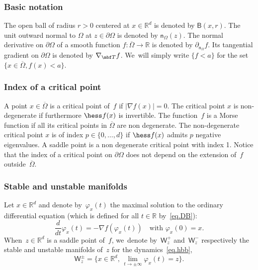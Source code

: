 \subsubsection*{Basic notation} The open ball of radius $r>0$ centered at $x\in \mathbb R^d$ is denoted by $\mathsf B(x,r)$. The unit outward normal to $\Omega$ at $z\in \partial \Omega$ is denoted by $\mathsf n_\Omega(z)$. The normal derivative on $\partial \Omega$ of a smooth function $f:\overline \Omega\to \mathbb R$ is denoted by $\partial_{\mathsf n_\Omega}f$. Its tangential gradient on $\partial \Omega$ is denoted by $\nabla_{\mbf T}f$. We~will simply write $\{f<a\}$ for the set \hbox{$\{x\in \overline \Omega, f(x)<a\}$}.

\subsubsection*{Index of a critical point} A point $x \in \overline{\Omega}$ is a critical
point of~$f$ if $|\nabla f(x)|=0$. The critical point $x$ is non-degenerate
if furthermore $\hess f(x)$ is invertible. The function~$f$ is a Morse function if all its critical points in $\overline \Omega$ are non degenerate. The non-degenerate critical
point $x$ is of index $p\in \{0,\ldots,d\}$ if $\hess f(x)$ admits $p$
negative eigenvalues. A saddle point is a non
degenerate critical point with index 1. Notice that the
index of a critical point on $\partial \Omega$ does not depend on the
extension of~$f$ outside~$\overline{\Omega}$.

\subsubsection*{Stable and unstable manifolds}
Let $x\in \mathbb R^d$ and denote by~$\varphi_x(t)$ the maximal
solution to the ordinary differential equation (which is defined
for all $t \in \mathbb R$ by~\eqref{eq.DB}):
\begin{equation}\label{eq.hbb}
\frac{d}{dt}\varphi_x(t)=-\nabla f(\varphi_x(t)) \quad\text{with } \varphi_x(0)=x.
\end{equation}
When~$z\in\mathbb R^d$ is a saddle point of~$f$, we~denote by~$\mathsf W_z^+$ and~$\mathsf W_z^-$ respectively the stable and unstable manifolds of~$z$ for the dynamics~\eqref{eq.hbb}, \ie
\begin{equation}\label{eq.stablem}
\mathsf W_z^{\pm}=\Big \{x\in \mathbb R^d,\, \lim_{t\to \pm \infty}\varphi_x(t)= z \Big \}.
\end{equation}

